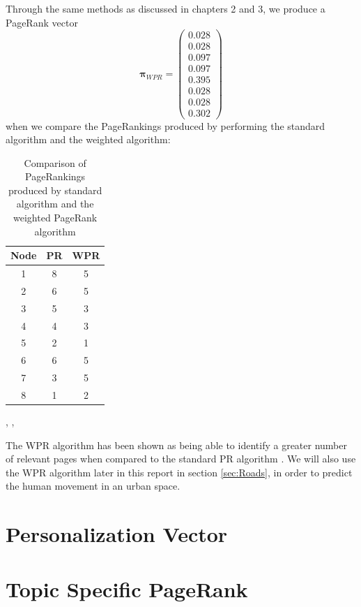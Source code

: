 \documentclass[11pt]{report}
\begin{document}
Through the same methods as discussed in chapters 2 and 3, we produce a PageRank vector \[\boldsymbol\pi_{WPR} = \left(
\begin{array}{c}
0.028 \\
0.028 \\
0.097 \\
0.097 \\
0.395 \\
0.028 \\
0.028 \\
0.302
\end{array}
\right)\]
when we compare the PageRankings produced by performing the standard algorithm and the weighted algorithm:
\begin{table}[H] \caption{Comparison of PageRankings produced by standard algorithm and the weighted PageRank algorithm}
 \centering
 \begin{tabular} {c| c c} 
 Node & PR & WPR \\ [0.5ex] 
 \hline
 1&8&5\\
 2&6&5\\
 3&5&3\\
 4&4&3\\
 5&2&1\\
 6&6&5\\
 7&3&5\\
 8&1&2\\
 \end{tabular}
 \label{comparison}
\end{table}
\cite{langville}, , \cite{baeza2004web}

The WPR algorithm has been shown as being able to identify a greater number of relevant pages when compared to the standard PR algorithm \cite{xing2004weighted}. We will also use the WPR algorithm later in this report in section \ref{sec:Roads}, in order to predict the human movement in an urban space. 

\section{Personalization Vector}

\section{Topic Specific PageRank}
\end{document}
